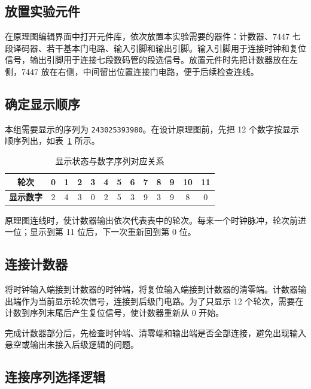 \documentclass[12pt]{ctexart}
\begin{document}
\subsection{放置实验元件}

在原理图编辑界面中打开元件库，依次放置本实验需要的器件：计数器、7447 七段译码器、若干基本门电路、输入引脚和输出引脚。输入引脚用于连接时钟和复位信号，输出引脚用于连接七段数码管的段选信号。放置元件时先把计数器放在左侧，7447 放在右侧，中间留出位置连接门电路，便于后续检查连线。

\subsection{确定显示顺序}

本组需要显示的序列为 \texttt{243025393980}。在设计原理图前，先把 12 个数字按显示顺序列出，如表~\ref{tab:display_sequence} 所示。

\begin{table}[H]
    \centering
    \caption{显示状态与数字序列对应关系}
    \label{tab:display_sequence}
    \begin{tabular}{ccccccccccccc}
        \toprule
        \textbf{轮次} & 0 & 1 & 2 & 3 & 4 & 5 & 6 & 7 & 8 & 9 & 10 & 11 \\
        \midrule
        \textbf{显示数字} & 2 & 4 & 3 & 0 & 2 & 5 & 3 & 9 & 3 & 9 & 8 & 0 \\
        \bottomrule
    \end{tabular}
\end{table}

原理图连线时，使计数器输出依次代表表中的轮次。每来一个时钟脉冲，轮次前进一位；显示到第 11 位后，下一次重新回到第 0 位。

\subsection{连接计数器}

将时钟输入端接到计数器的时钟端，将复位输入端接到计数器的清零端。计数器输出端作为当前显示轮次信号，连接到后级门电路。为了只显示 12 个轮次，需要在计数到序列末尾后产生复位信号，使计数器重新从 0 开始。

完成计数器部分后，先检查时钟端、清零端和输出端是否全部连接，避免出现输入悬空或输出未接入后级逻辑的问题。

\subsection{连接序列选择逻辑}
\end{document}
